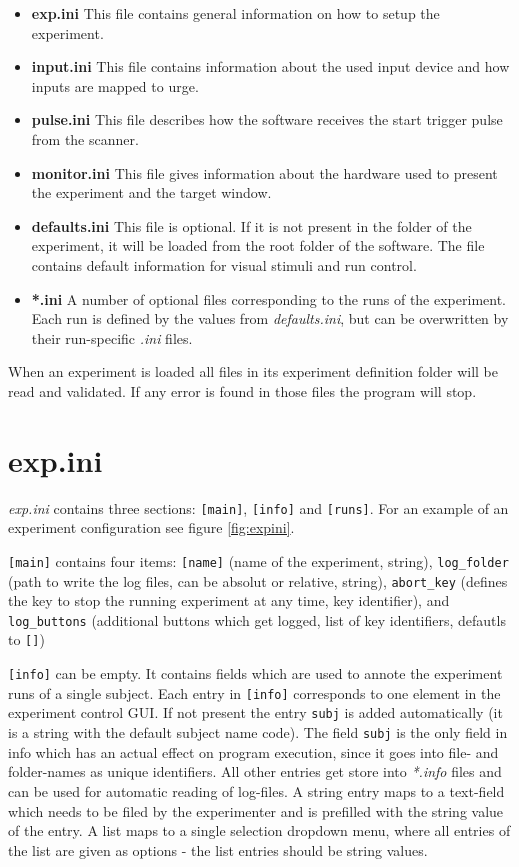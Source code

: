 \documentclass[12pt,a4paper]{book}
\begin{document}
\begin{itemize}
	\item \textbf{exp.ini} This file contains general information on how to setup the experiment.
	\item \textbf{input.ini} This file contains information about the used input device and how inputs are mapped to urge.
	\item \textbf{pulse.ini} This file describes how the software receives the start trigger pulse from the scanner.
	\item \textbf{monitor.ini} This file gives information about the hardware used to present the experiment and the target window.
	\item \textbf{defaults.ini} This file is optional. If it is not present in the folder of the experiment, it will be loaded from the root folder of the software. The file contains default information for visual stimuli and run control.
	\item \textbf{*.ini} A number of optional files corresponding to the runs of the experiment. Each run is defined by the values from \textit{defaults.ini}, but can be overwritten by their run-specific \textit{.ini} files.
\end{itemize}

When an experiment is loaded all files in its experiment definition folder will be read and validated. If any error is found in those files the program will stop.

\section{exp.ini}\label{sec:expini}

\textit{exp.ini} contains three sections: \verb|[main]|, \verb|[info]| and \verb|[runs]|. For an example of an experiment configuration see figure \ref{fig:expini}.

\verb|[main]| contains four items: \verb|[name]| (name of the experiment, string), \verb|log_folder| (path to write the log files, can be absolut or relative, string), \verb|abort_key| (defines the key to stop the running experiment at any time, key identifier), and \verb|log_buttons| (additional buttons which get logged, list of key identifiers, defautls to \verb|[]|)

\verb|[info]| can be empty. It contains fields which are used to annote the experiment runs of a single subject. Each entry in \verb|[info]| corresponds to one element in the experiment control GUI. If not present the entry \verb|subj| is added automatically (it is a string with the default subject name code). The field \verb|subj| is the only field in info which has an actual effect on program execution, since it goes into file- and folder-names as unique identifiers. All other entries get store into \textit{*.info} files and can be used for automatic reading of log-files. A string entry maps to a text-field which needs to be filed by the experimenter and is prefilled with the string value of the entry. A list maps to a single selection dropdown menu, where all entries of the list are given as options - the list entries should be string values.
\end{document}
